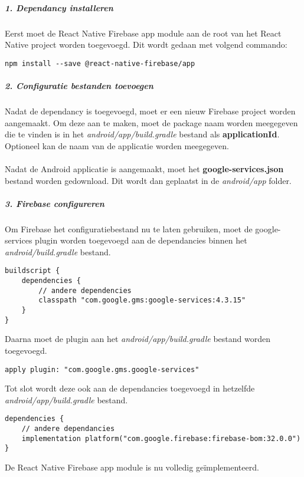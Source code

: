 \subparagraph{1. Dependancy installeren}
Eerst moet de React Native Firebase app module aan de root van het React Native project worden toegevoegd. 
Dit wordt gedaan met volgend commando:
\begin{verbatim}
npm install --save @react-native-firebase/app
\end{verbatim}

\subparagraph{2. Configuratie bestanden toevoegen}
Nadat de dependancy is toegevoegd, moet er een nieuw Firebase project worden aangemaakt. 
Om deze aan te maken, moet de package naam worden meegegeven die te vinden is in het 
\textit{android/app/build.gradle} bestand als 
\textbf{applicationId}. Optioneel kan de naam van de applicatie worden meegegeven.
\\\\
Nadat de Android applicatie is aangemaakt, moet het \textbf{google-services.json} bestand worden gedownload. 
Dit wordt dan geplaatst in de \textit{android/app} folder.

\subparagraph{3. Firebase configureren}
Om Firebase het configuratiebestand nu te laten gebruiken, moet de google-services plugin worden toegevoegd aan 
de dependancies binnen het \textit{android/build.gradle} bestand. 
\begin{verbatim}
buildscript {
    dependencies {
        // andere dependencies
        classpath "com.google.gms:google-services:4.3.15"
    }
}
\end{verbatim}
Daarna moet de plugin aan het \textit{android/app/build.gradle} bestand worden toegevoegd.
\begin{verbatim}
apply plugin: "com.google.gms.google-services"
\end{verbatim}
Tot slot wordt deze ook aan de dependancies toegevoegd in hetzelfde \textit{android/app/build.gradle} bestand.
\begin{verbatim}
dependencies {
    // andere dependancies
    implementation platform("com.google.firebase:firebase-bom:32.0.0")
}
\end{verbatim}
De React Native Firebase app module is nu volledig geïmplementeerd.